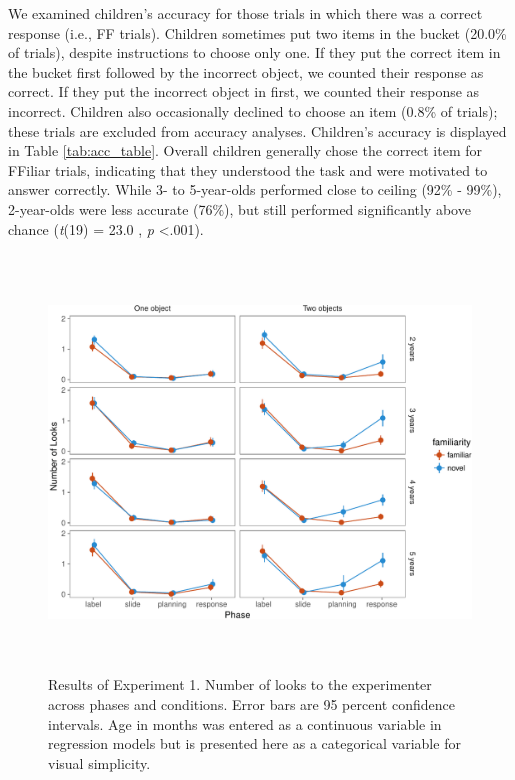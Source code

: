 \documentclass[a4paper,man,apacite,floatsintext]{apa6}
\newenvironment{CodeChunk}{}{}
\begin{document}
We examined children's accuracy for those trials in which there was a
correct response (i.e., FF trials). Children sometimes put two items in
the bucket (20.0\% of trials), despite instructions to choose only one.
If they put the correct item in the bucket first followed by the
incorrect object, we counted their response as correct. If they put the
incorrect object in first, we counted their response as incorrect.
Children also occasionally declined to choose an item (0.8\% of trials);
these trials are excluded from accuracy analyses. Children's accuracy is
displayed in Table \ref{tab:acc_table}. Overall children generally chose
the correct item for FFiliar trials, indicating that they understood the
task and were motivated to answer correctly. While 3- to 5-year-olds
performed close to ceiling (92\% - 99\%), 2-year-olds were less accurate
(76\%), but still performed significantly above chance (\emph{t}(19) =
23.0 , \emph{p} \textless{}.001).

\begin{CodeChunk}
\begin{figure}[b]

{\centering \includegraphics[width=5.75in,height=4.35in]{figs/results_e1-1} 

}

\caption[Results of Experiment 1]{Results of Experiment 1. Number of looks to the experimenter across phases and conditions. Error bars are 95 percent confidence intervals. Age in months was entered as a continuous variable in regression models but is presented here as a categorical variable for visual simplicity.}\label{fig:results_e1}
\end{figure}
\end{CodeChunk}
\end{document}
